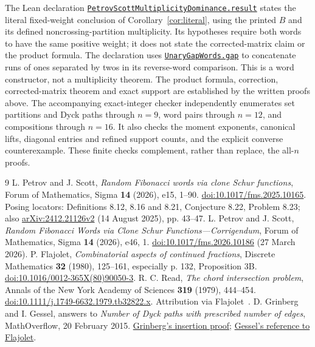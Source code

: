 \documentclass[11pt]{article}
\begin{document}
The Lean declaration
\href{https://github.com/the-omega-institute/trureturing/blob/e277c80d045570daf43bd03b4e313f7ce457b4e2/D5/S3/Combinatorics/YoungFibonacci/PetrovScottMultiplicityDominance.lean}{\texttt{PetrovScottMultiplicityDominance.}\allowbreak\texttt{result}}
states the literal fixed-weight conclusion of
Corollary~\ref{cor:literal}, using the printed $B$ and its defined
noncrossing-partition multiplicity. Its hypotheses require both words to
have the same positive weight; it does not state the corrected-matrix
claim or the product formula. The declaration uses
\href{https://github.com/the-omega-institute/trureturing/blob/e277c80d045570daf43bd03b4e313f7ce457b4e2/D5/S1/Words/UnaryGapWords.lean}{\texttt{UnaryGapWords.gap}}
to concatenate runs of ones separated by twos in its reverse-word
comparison. This is a word constructor, not a multiplicity theorem.
The product formula, correction,
corrected-matrix theorem and exact support are established by the
written proofs above. The accompanying exact-integer checker independently
enumerates set partitions and Dyck paths through $n=9$, word pairs
through $n=12$, and compositions through $n=16$. It also checks the
moment exponents, canonical lifts, diagonal entries and refined support
counts, and the explicit converse counterexample. These finite checks
complement, rather than replace, the all-$n$ proofs.

\begin{thebibliography}{9}
\small
{} L. Petrov and J. Scott,
\emph{Random Fibonacci words via clone Schur functions},
Forum of Mathematics, Sigma \textbf{14} (2026), e15, 1--90.
\href{https://doi.org/10.1017/fms.2025.10165}{doi:10.1017/fms.2025.10165}.
Posing locators: Definitions 8.12, 8.16 and 8.21, Conjecture 8.22,
Problem 8.23; also
\href{https://arxiv.org/abs/2412.21126v2}{arXiv:2412.21126v2}
(14 August 2025), pp. 43--47.
 L. Petrov and J. Scott,
\emph{Random Fibonacci Words via Clone Schur Functions---Corrigendum},
Forum of Mathematics, Sigma \textbf{14} (2026), e46, 1.
\href{https://doi.org/10.1017/fms.2026.10186}{doi:10.1017/fms.2026.10186}
(27 March 2026).
 P. Flajolet,
\emph{Combinatorial aspects of continued fractions},
Discrete Mathematics \textbf{32} (1980), 125--161,
especially p. 132, Proposition 3B.
\href{https://doi.org/10.1016/0012-365X(80)90050-3}{doi:10.1016/0012-365X(80)90050-3}.
 R. C. Read,
\emph{The chord intersection problem},
Annals of the New York Academy of Sciences \textbf{319} (1979), 444--454.
\href{https://doi.org/10.1111/j.1749-6632.1979.tb32822.x}{doi:10.1111/j.1749-6632.1979.tb32822.x}.
Attribution via Flajolet~\cite[Proposition~10(i), footnote~2]{F}.
 D. Grinberg and I. Gessel, answers to
\emph{Number of Dyck paths with prescribed number of edges},
MathOverflow, 20 February 2015.
\href{https://mathoverflow.net/a/198057}{Grinberg's insertion proof};
\href{https://mathoverflow.net/a/198059}{Gessel's reference to Flajolet}.
\end{thebibliography}
\end{document}
